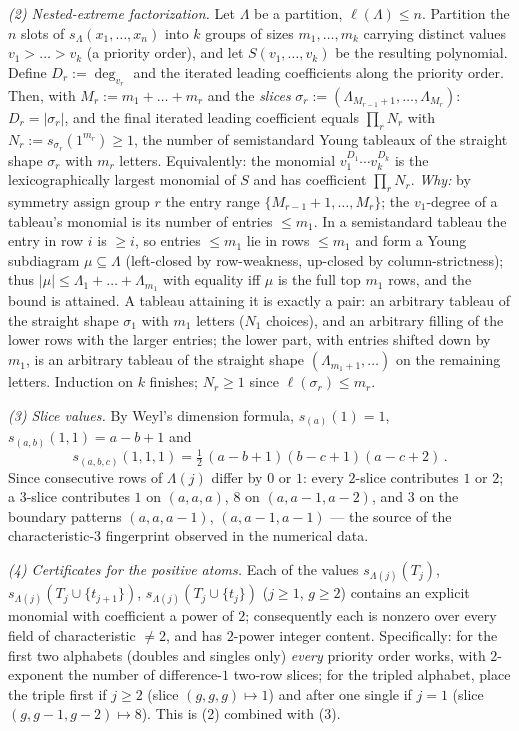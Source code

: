 \begin{remark}
\emph{(2) Nested-extreme factorization.}
Let $\Lambda$ be a partition, $\ell(\Lambda) \le n$. Partition the $n$ slots of
$s_\Lambda(x_1, \dots, x_n)$ into $k$ groups of sizes $m_1, \dots, m_k$ carrying
distinct values $v_1 > \dots > v_k$ (a priority order), and let $S(v_1, \dots, v_k)$ be
the resulting polynomial. Define $D_r := \deg_{v_r}$ and the iterated leading
coefficients along the priority order. Then, with $M_r := m_1 + \dots + m_r$ and the
\emph{slices} $\sigma_r := (\Lambda_{M_{r-1}+1}, \dots, \Lambda_{M_r})$:
$D_r = |\sigma_r|$, and the final iterated leading coefficient equals
$\prod_r N_r$ with $N_r := s_{\sigma_r}(1^{m_r}) \ge 1$, the number of semistandard
Young tableaux of the straight shape $\sigma_r$ with $m_r$ letters. Equivalently: the
monomial $v_1^{D_1} \cdots v_k^{D_k}$ is the lexicographically largest monomial of $S$
and has coefficient $\prod_r N_r$.
\emph{Why:} by symmetry assign group $r$ the entry range $\{M_{r-1}+1, \dots, M_r\}$;
the $v_1$-degree of a tableau's monomial is its number of entries $\le m_1$. In a
semistandard tableau the entry in row $i$ is $\ge i$, so entries $\le m_1$ lie in rows
$\le m_1$ and form a Young subdiagram $\mu \subseteq \Lambda$ (left-closed by
row-weakness, up-closed by column-strictness); thus
$|\mu| \le \Lambda_1 + \dots + \Lambda_{m_1}$ with equality iff $\mu$ is the full top
$m_1$ rows, and the bound is attained. A tableau attaining it is exactly a pair: an
arbitrary tableau of the straight shape $\sigma_1$ with $m_1$ letters ($N_1$ choices),
and an arbitrary filling of the lower rows with the larger entries; the lower part, with
entries shifted down by $m_1$, is an arbitrary tableau of the straight shape
$(\Lambda_{m_1+1}, \dots)$ on the remaining letters. Induction on $k$ finishes;
$N_r \ge 1$ since $\ell(\sigma_r) \le m_r$.

\emph{(3) Slice values.}
By Weyl's dimension formula, $s_{(a)}(1) = 1$, $s_{(a,b)}(1,1) = a - b + 1$ and
\[ s_{(a,b,c)}(1,1,1) = \tfrac12\,(a-b+1)(b-c+1)(a-c+2)\,. \]
Since consecutive rows of $\Lambda(j)$ differ by $0$ or $1$: every $2$-slice contributes $1$ or $2$; a
$3$-slice contributes $1$ on $(a,a,a)$, $8$ on $(a, a{-}1, a{-}2)$, and $3$ on the
boundary patterns $(a,a,a{-}1)$, $(a,a{-}1,a{-}1)$ --- the source of the
characteristic-$3$ fingerprint observed in the numerical data.

\emph{(4) Certificates for the positive atoms.}
Each of the values $s_{\Lambda(j)}(T_j)$, $s_{\Lambda(j)}(T_j \cup \{t_{j+1}\})$,
$s_{\Lambda(j)}(T_j \cup \{t_j\})$ ($j \ge 1$, $g \ge 2$) contains an explicit monomial
with coefficient a power of $2$; consequently each is nonzero over every field of
characteristic $\neq 2$, and has $2$-power integer content. Specifically: for the first
two alphabets (doubles and singles only) \emph{every} priority order works, with
$2$-exponent the number of difference-$1$ two-row slices; for the tripled alphabet,
place the triple first if $j \ge 2$ (slice $(g,g,g) \mapsto 1$) and after one single if
$j = 1$ (slice $(g, g{-}1, g{-}2) \mapsto 8$). This is (2) combined with (3).


\end{remark}
